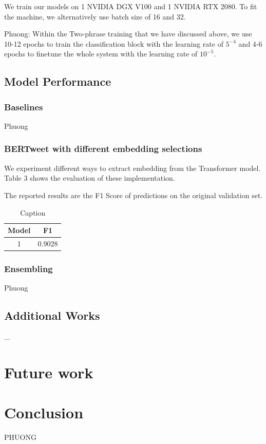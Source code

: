 \documentclass[11pt,a4paper]{article}
\begin{document}
We train our models on 1 NVIDIA DGX V100 and 1 NVIDIA RTX 2080. To fit the machine, we alternatively use batch size of 16 and 32.

Phuong: Within the Two-phrase training that we have discussed above, we use 10-12 epochs to train the classification block with the learning rate of $5^{-4}$ and 4-6 epochs to finetune the whole system with the learning rate of $10^{-5}$.


\subsection{Model Performance}
\subsubsection{Baselines}
Phuong
\subsubsection{BERTweet with different embedding selections}
We experiment different ways to extract embedding from the Transformer model. Table 3 shows the evaluation of these implementation.

The reported results are the F1 Score of predictions on the original validation set.
\begin{table}
    \centering
    \begin{tabular}{|c|c|}
        \hline
        Model & F1 \\\hline
        1 & 0.9028 \\\hline
    \end{tabular}
    \caption{Caption}
    \label{tab:my_label}
\end{table}

\subsubsection{Ensembling}
Phuong

\subsection{Additional Works}
...



\section{Future work}

\section{Conclusion}

PHUONG






\end{document}
